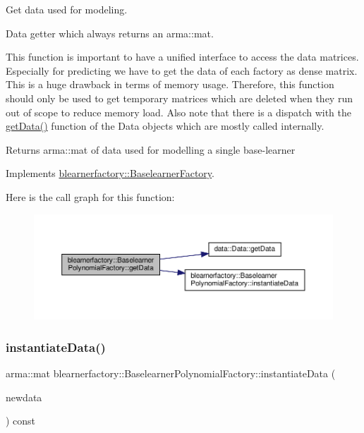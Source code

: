 Get data used for modeling. 

Data getter which always returns an arma\+::mat.

This function is important to have a unified interface to access the data matrices. Especially for predicting we have to get the data of each factory as dense matrix. This is a huge drawback in terms of memory usage. Therefore, this function should only be used to get temporary matrices which are deleted when they run out of scope to reduce memory load. Also note that there is a dispatch with the \hyperlink{classblearnerfactory_1_1_baselearner_polynomial_factory_af6d997c89f2e81a490352f23dee1ef9d}{get\+Data()} function of the Data objects which are mostly called internally.

\begin{DoxyReturn}{Returns}
{\ttfamily arma\+::mat} of data used for modelling a single base-\/learner 
\end{DoxyReturn}


Implements \hyperlink{classblearnerfactory_1_1_baselearner_factory_aa3e4580bca870ca3b742dda6c820e1e6}{blearnerfactory\+::\+Baselearner\+Factory}.

Here is the call graph for this function\+:
\nopagebreak
\begin{figure}[H]
\begin{center}
\leavevmode
\includegraphics[width=350pt]{classblearnerfactory_1_1_baselearner_polynomial_factory_af6d997c89f2e81a490352f23dee1ef9d_cgraph}
\end{center}
\end{figure}
\mbox{\label{classblearnerfactory_1_1_baselearner_polynomial_factory_a3b84557f192ac156032ca4ad22fd341b}} 
\subsubsection{\texorpdfstring{instantiate\+Data()}{instantiateData()}}
{\footnotesize\ttfamily arma\+::mat blearnerfactory\+::\+Baselearner\+Polynomial\+Factory\+::instantiate\+Data (\begin{DoxyParamCaption}\item[{const arma\+::mat \&}]{newdata }\end{DoxyParamCaption}) const\hspace{0.3cm}{\ttfamily [virtual]}}



